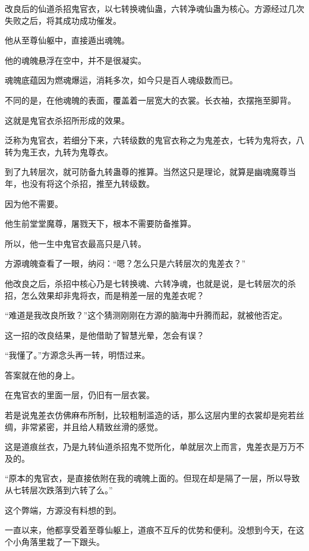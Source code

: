 
\begin{this_body}

改良后的仙道杀招鬼官衣，以七转换魂仙蛊，六转净魂仙蛊为核心。方源经过几次失败之后，将其成功成功催发。

他从至尊仙躯中，直接遁出魂魄。

他的魂魄悬浮在空中，并不是很凝实。

魂魄底蕴因为燃魂爆运，消耗多次，如今只是百人魂级数而已。

不同的是，在他魂魄的表面，覆盖着一层宽大的衣裳。长衣袖，衣摆拖至脚背。

这就是鬼官衣杀招所形成的效果。

泛称为鬼官衣，若细分下来，六转级数的鬼官衣称之为鬼差衣，七转为鬼将衣，八转为鬼王衣，九转为鬼尊衣。

到了九转层次，就可防备九转蛊尊的推算。当然这只是理论，就算是幽魂魔尊当年，也没有将这个杀招，推至九转级数。

因为他不需要。

他生前堂堂魔尊，屠戮天下，根本不需要防备推算。

所以，他一生中鬼官衣最高只是八转。

方源魂魄查看了一眼，纳闷：“嗯？怎么只是六转层次的鬼差衣？”

他改良之后，杀招中核心乃是七转换魂、六转净魂，也就是说，是七转层次的杀招，怎么效果却非鬼将衣，而是稍差一层的鬼差衣呢？

“难道是我改良所致？”这个猜测刚刚在方源的脑海中升腾而起，就被他否定。

这一招的改良结果，是他借助了智慧光晕，怎会有误？

“我懂了。”方源念头再一转，明悟过来。

答案就在他的身上。

在鬼官衣的里面一层，仍旧有一层衣裳。

若是说鬼差衣仿佛麻布所制，比较粗制滥造的话，那么这层内里的衣裳却是宛若丝绸，非常紧密，并且给人精致丝滑的感觉。

这是道痕丝衣，乃是九转仙道杀招鬼不觉所化，单就层次上而言，鬼差衣是万万不及的。

“原本的鬼官衣，是直接依附在我的魂魄上面的。但现在却是隔了一层，所以导致从七转层次跌落到六转了么。”

这个弊端，方源没有料想的到。

一直以来，他都享受着至尊仙躯上，道痕不互斥的优势和便利。没想到今天，在这个小角落里栽了一下跟头。


\end{this_body}

